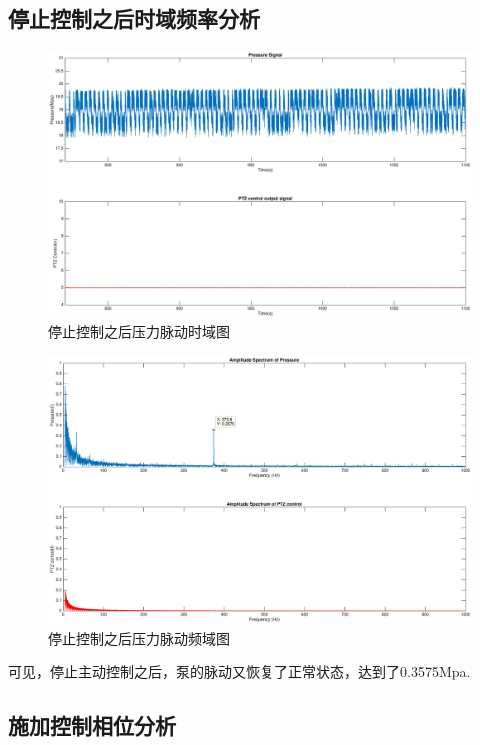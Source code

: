 \documentclass[12pt]{article}
\begin{document}
\subsection{停止控制之后时域频率分析}

\begin{figure}[H]
\begin{center}
\includegraphics[width=0.9\linewidth]{./images/time_domain_result_giveup_control.eps}
\caption{停止控制之后压力脉动时域图}
\label{fig:fig12}
\end{center}
\end{figure}

\begin{figure}[H]
\begin{center}
\includegraphics[width=0.9\linewidth]{./images/fft_result_giveup_control.eps}
\caption{停止控制之后压力脉动频域图}
\label{fig:fig13}
\end{center}
\end{figure}

可见，停止主动控制之后，泵的脉动又恢复了正常状态，达到了0.3575Mpa.

\subsection{施加控制相位分析}
\end{document}
